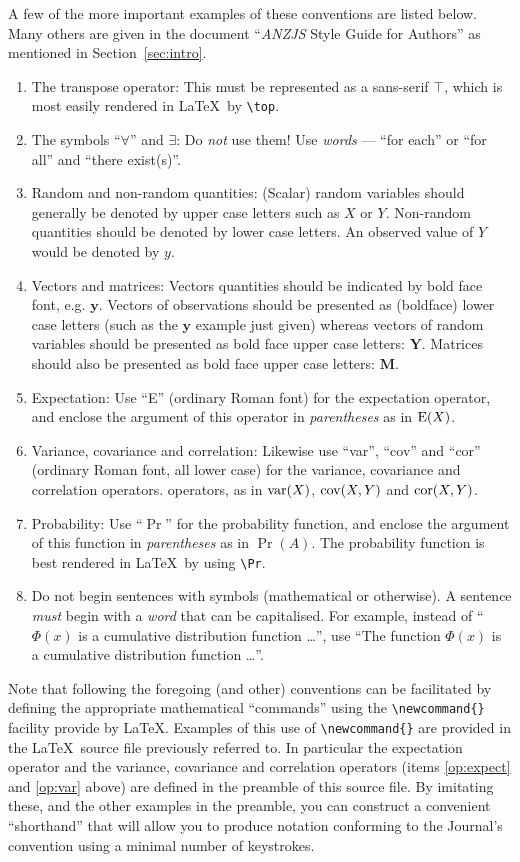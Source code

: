 \documentclass[times, doublespace]{anzsauth}
\newcommand{\E}{\mbox{$\textrm{\textup{E}}$}}
\newcommand{\var}{\mbox{$\textrm{\textup{var}}$}}
\newcommand{\cov}{\mbox{$\textrm{\textup{cov}}$}}
\newcommand{\cor}{\mbox{$\textrm{\textup{cor}}$}}
\newcommand{\by}{\mbox{$\boldsymbol{y}$}}
\newcommand{\bY}{\mbox{$\boldsymbol{Y}$}}
\newcommand{\bM}{\mbox{$\boldsymbol{M}$}}
\begin{document}
A few of the more important examples of these conventions are
listed below.  Many others are given in the document ``\textit{ANZJS}
Style Guide for Authors'' as mentioned in Section~\ref{sec:intro}.
\begin{enumerate}
\item The transpose operator:  This must be represented as a
sans-serif $\top$, which is most easily rendered in \LaTeX\
by \verb!\top!.
\item The symbols ``$\forall$'' and $\exists$: Do \emph{not}
use them!  Use \emph{words} --- ``for each'' or ``for all'' and
``there exist(s)''.
\item Random and non-random quantities:  (Scalar) random variables
should generally be denoted by upper case letters such as $X$ or $Y$.
Non-random quantities should be denoted by lower case letters. An
observed value of $Y$ would be denoted by $y$.
\item Vectors and matrices:  Vectors quantities should be indicated
by bold face font, e.g. $\by$.  Vectors of observations should
be presented as (boldface) lower case letters (such as the $\by$ example
just given) whereas vectors
of random variables should be presented as bold face upper case
letters: $\bY$.  Matrices should also be presented as bold face
upper case letters: $\bM$.
\item Expectation:  Use ``E'' (ordinary Roman font) for the
expectation operator, and enclose the argument of this operator in
\emph{parentheses} as in $\E(X)$. \label{op:expect}
\item Variance, covariance and correlation:  Likewise use ``var'',
``cov'' and ``cor'' (ordinary Roman font, all lower case) for the
variance, covariance and correlation operators.
operators, as in $\var(X)$, $\cov(X,Y)$ and $\cor(X,Y)$. \label{op:var}
\item Probability: Use ``$\Pr$'' for the probability function,
and enclose the argument of this function in \emph{parentheses}
as in $\Pr(A)$.  The probability function is best rendered
in \LaTeX\ by using \verb!\Pr!.
\item Do not begin sentences with symbols (mathematical or
otherwise).  A sentence \emph{must} begin with a \emph{word}
that can be capitalised. For example, instead of ``$\Phi(x)$ is
a cumulative distribution function \ldots'', use ``The function
$\Phi(x)$ is a cumulative distribution function \ldots''.
\end{enumerate}

Note that following the foregoing (and other) conventions can be
facilitated by defining the appropriate mathematical ``commands''
using the \verb!\newcommand{}! facility provide by \LaTeX.  Examples
of this use of \verb!\newcommand{}! are provided in the \LaTeX\
source file previously referred to.  In particular the expectation
operator and the variance, covariance and correlation operators
(items \ref{op:expect} and \ref{op:var} above) are defined in
the preamble of this source file.  By imitating these, and the
other examples in the preamble, you can construct a convenient
``shorthand'' that will allow you to produce notation conforming
to the Journal's convention using a minimal number of keystrokes.
\end{document}
